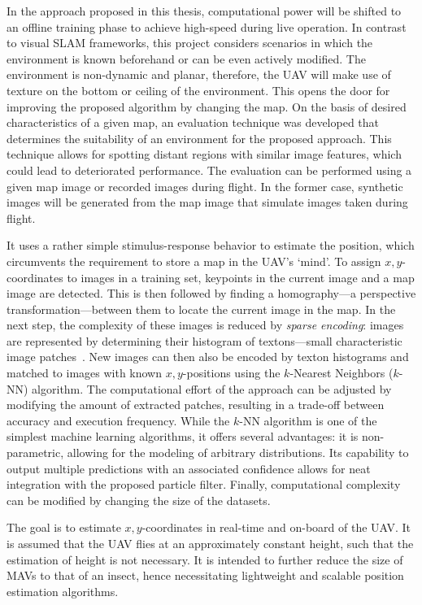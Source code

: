 \documentclass{report}
\begin{document}
In the approach proposed in this thesis, computational power will be
shifted to an offline training phase to achieve high-speed during live
operation. In contrast to visual SLAM frameworks, this project
considers scenarios in which the environment is known beforehand or
can be even actively modified. The environment is non-dynamic and
planar, therefore, the UAV will make use of texture on the bottom or
ceiling of the environment. This opens the door for improving the
proposed algorithm by changing the map. On the basis of desired
characteristics of a given map, an evaluation technique was developed
that determines the suitability of an environment for the proposed
approach. This technique allows for spotting distant regions with
similar image features, which could lead to deteriorated
performance. The evaluation can be performed using a given map image
or recorded images during flight. In the former case, synthetic images
will be generated from the map image that simulate images taken during
flight.

It uses a rather simple stimulus-response behavior to estimate the
position, which circumvents the requirement to store a map in the
UAV's `mind'. To assign $x,y$-coordinates to images in a training set,
keypoints in the current image and a map image are detected. This is
then followed by finding a homography---a perspective
transformation---between them to locate the current image in the
map. In the next step, the complexity of these images is reduced by
\emph{sparse encoding}: images are represented by determining their
histogram of textons---small characteristic image
patches~\cite{varma2005statistical}.  New images can then also be
encoded by texton histograms and matched to images with known
$x,y$-positions using the $k$-Nearest Neighbors ($k$-NN)
algorithm. The computational effort of the approach can be adjusted by
modifying the amount of extracted patches, resulting in a trade-off
between accuracy and execution frequency. While the $k$-NN algorithm
is one of the simplest machine learning algorithms, it offers several
advantages: it is non-parametric, allowing for the modeling of
arbitrary distributions. Its capability to output multiple predictions
with an associated confidence allows for neat integration with the
proposed particle filter. Finally, computational complexity can be
modified by changing the size of the datasets.

The goal is to estimate $x,y$-coordinates in real-time and on-board of
the UAV. It is assumed that the UAV flies at an approximately constant
height, such that the estimation of height is not necessary.  It is
intended to further reduce the size of MAVs to that of an insect,
hence necessitating lightweight and scalable position estimation
algorithms.
\end{document}

